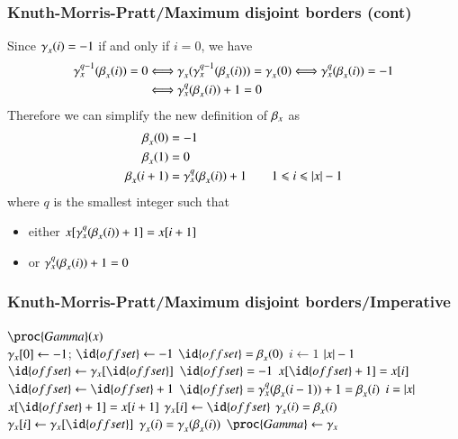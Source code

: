 %
\begin{frame}
\frametitle{Knuth-Morris-Pratt/Maximum disjoint borders (cont)}

Since \(\gamma_{x}^{}(i) = -1\) if and only if \(i=0\), we have
\begin{align*}
\gamma_{x}^{q-1}(\beta_{x}^{}(i)) = 0
&\Longleftrightarrow
\gamma_{x}^{}(\gamma_{x}^{q-1}(\beta_{x}^{}(i))) =
\gamma_{x}^{}(0)
\Longleftrightarrow
\gamma_{x}^{q}(\beta_{x}^{}(i)) = -1\\
&\Longleftrightarrow
\gamma_{x}^{q}(\beta_{x}^{}(i)) + 1 = 0
\end{align*}
Therefore we can simplify the new definition of \(\beta_{x}\)
as
\begin{align*}
\beta_{x}^{}(0) &= -1\\
\beta_{x}^{}(1) &= 0\\
\beta_{x}^{}(i + 1) &= \gamma_{x}^{q}(\beta_{x}^{}(i)) + 1
\qquad 1 \leqslant i \leqslant \lvert{x}\lvert{} - 1
\end{align*}
where \(q\) is the smallest integer such that
\begin{itemize}

  \item either \(x[\gamma_{x}^{q}(\beta_{x}^{}(i)) + 1]=x[i+1]\)

  \item or \(\gamma_{x}^{q}(\beta_{x}^{}(i)) + 1 = 0\)

\end{itemize}

\end{frame}

%
\begin{frame}
\frametitle{Knuth-Morris-Pratt/Maximum disjoint borders/Imperative}

{\small
\begin{codebox}
\(\proc{Gamma} (x)\)\\
\li \(\gamma_{x}[0] \gets -1\); \(\id{offset} \gets -1\)
    \RComment \(\id{offset} = \MPsupply{x}{}{0}\)
\li \For \(i \gets 1\) \To \(\lvert{x}\lvert{}-1\)
\li \Do \Repeat
\li       \(\id{offset} \gets \KMPsupplyName_{x}[\id{offset}]\)
\li     \Until \(\id{offset} = -1\) \LogOr \(x[\id{offset} + 1] = x[i]\)
\li     \(\id{offset} \gets \id{offset} + 1\)
        \RComment \(\id{offset} = \KMPsupply{x}{q}{\MPsupply{x}{}{i-1}} +
        1 = \MPsupply{x}{}{i}\)
\li     \If \(i = \lvert{x}\lvert{}\) \LogOr \(x[\id{offset}+1] = x[i+1]\)
\li     \Then \(\KMPsupplyName_{x}[i] \gets \id{offset}\)
              \RComment \(\gamma_{x}^{}(i) = \beta_{x}^{}(i)\)
\li     \Else \(\KMPsupplyName_{x}[i] \gets \KMPsupplyName_{x}[\id{offset}]\)
              \RComment \(\gamma_{x}^{}(i) =
              \gamma_{x}^{}(\beta_{x}^{}(i))\)
        \End
    \End
\li \(\proc{Gamma} \gets \KMPsupplyName_{x}\)
\end{codebox}
}

\end{frame}

